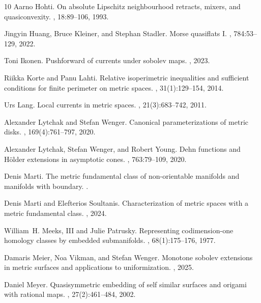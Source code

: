 \documentclass{amsart}
\numberwithin{equation}{section}
\begin{document}
\begin{thebibliography}{10}
Aarno Hohti.
\newblock On absolute {Lipschitz} neighbourhood retracts, mixers, and quasiconvexity.
, 18:89--106, 1993.

Jingyin Huang, Bruce Kleiner, and Stephan Stadler.
\newblock Morse quasiflats {I}.
, 784:53--129, 2022.

Toni Ikonen.
\newblock Pushforward of currents under sobolev maps.
, 2023.

Riikka Korte and Panu Lahti.
\newblock Relative isoperimetric inequalities and sufficient conditions for finite perimeter on metric spaces.
, 31(1):129--154, 2014.

Urs Lang.
\newblock Local currents in metric spaces.
, 21(3):683--742, 2011.

Alexander Lytchak and Stefan Wenger.
\newblock Canonical parameterizations of metric disks.
, 169(4):761--797, 2020.

Alexander Lytchak, Stefan Wenger, and Robert Young.
\newblock Dehn functions and {H}\"older extensions in asymptotic cones.
, 763:79--109, 2020.

Denis Marti.
\newblock The metric fundamental class of non-orientable manifolds and manifolds with boundary.
.

Denis Marti and Elefterios Soultanis.
\newblock Characterization of metric spaces with a metric fundamental class.
, 2024.

William~H. Meeks, III and Julie Patrusky.
\newblock Representing codimension-one homology classes by embedded submanifolds.
, 68(1):175--176, 1977.

Damaris Meier, Noa Vikman, and Stefan Wenger.
\newblock Monotone sobolev extensions in metric surfaces and applications to uniformization.
, 2025.

Daniel Meyer.
\newblock Quasisymmetric embedding of self similar surfaces and origami with rational maps.
, 27(2):461--484, 2002.


\end{thebibliography}
\end{document}
